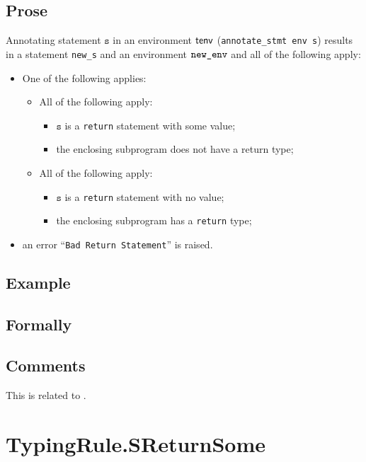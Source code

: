 \documentclass{book}
\newcommand\vs[0]{\texttt{s}}
\begin{document}
  \subsection{Prose}
Annotating statement $\vs$ in an environment $\textsf{tenv}$
(\texttt{annotate\_stmt env s}) results in a statement \texttt{new\_s} and an
environment $\texttt{new\_env}$ and all of the following apply:
   \begin{itemize}
   \item One of the following applies:
     \begin{itemize}
     \item All of the following apply:
       \begin{itemize}
       \item $\vs$ is a \texttt{return} statement with some value;
       \item the enclosing subprogram does not have a return type;
       \end{itemize}
     \item All of the following apply:
       \begin{itemize}
       \item $\vs$ is a \texttt{return} statement with no value;
       \item the enclosing subprogram has a \texttt{return} type;
       \end{itemize}
     \end{itemize}
   \item an error ``\texttt{Bad Return Statement}'' is raised.
   \end{itemize}

  \subsection{Example}



\begin{emptyformal}
    \subsection{Formally}
\end{emptyformal}

\subsection{Comments}
    This is related to .

\section{TypingRule.SReturnSome \label{sec:TypingRule.SReturnSome}}
\end{document}
